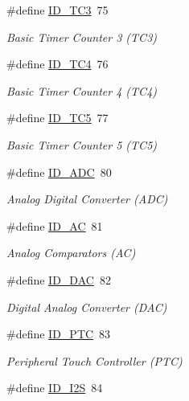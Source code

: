 \begin{DoxyCompactItemize}
\#define \mbox{\hyperlink{group___s_a_m_d21_g18_a__id_gac978ebe37e0ce9dfe2eec2f15ab83015}{I\+D\+\_\+\+T\+C3}}~75
\begin{DoxyCompactList}\small\item\em Basic Timer Counter 3 (T\+C3) \end{DoxyCompactList}\item 
\#define \mbox{\hyperlink{group___s_a_m_d21_g18_a__id_ga59ecaec462139ce30c8ebe1dc25f9f7d}{I\+D\+\_\+\+T\+C4}}~76
\begin{DoxyCompactList}\small\item\em Basic Timer Counter 4 (T\+C4) \end{DoxyCompactList}\item 
\#define \mbox{\hyperlink{group___s_a_m_d21_g18_a__id_ga60408f0e4285fc6e0e837aad86b862f8}{I\+D\+\_\+\+T\+C5}}~77
\begin{DoxyCompactList}\small\item\em Basic Timer Counter 5 (T\+C5) \end{DoxyCompactList}\item 
\#define \mbox{\hyperlink{group___s_a_m_d21_g18_a__id_gafb7efa537d1d64419483b97f642009fd}{I\+D\+\_\+\+A\+DC}}~80
\begin{DoxyCompactList}\small\item\em Analog Digital Converter (A\+DC) \end{DoxyCompactList}\item 
\#define \mbox{\hyperlink{group___s_a_m_d21_g18_a__id_ga20fe08f8d0b2a4e6c0dbb2371aacadb0}{I\+D\+\_\+\+AC}}~81
\begin{DoxyCompactList}\small\item\em Analog Comparators (AC) \end{DoxyCompactList}\item 
\#define \mbox{\hyperlink{group___s_a_m_d21_g18_a__id_ga2561118247335c13b56f7a79a17fceff}{I\+D\+\_\+\+D\+AC}}~82
\begin{DoxyCompactList}\small\item\em Digital Analog Converter (D\+AC) \end{DoxyCompactList}\item 
\#define \mbox{\hyperlink{group___s_a_m_d21_g18_a__id_ga6ce249818b3ff70438a4eff92e49d38e}{I\+D\+\_\+\+P\+TC}}~83
\begin{DoxyCompactList}\small\item\em Peripheral Touch Controller (P\+TC) \end{DoxyCompactList}\item 
\#define \mbox{\hyperlink{group___s_a_m_d21_g18_a__id_gac57cc3843ee128de44e5f43b5a272357}{I\+D\+\_\+\+I2S}}~84

\end{DoxyCompactItemize}
